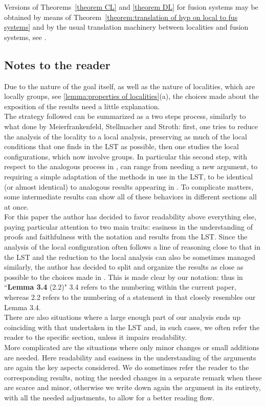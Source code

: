 \documentclass{amsart}
\numberwithin{equation}{section}
\theoremstyle{definition}
\theoremstyle{subresult}
\theoremstyle{caseresult}
\newcommand{\<}{\langle}
\renewcommand{\>}{\rangle}
\begin{document}
Versions of Theorems~\ref{theorem CL} and \ref{theorem DL} for fusion systems may be obtained by means of Theorem~\ref{theorem:translation of hyp on local to fus systems} and by the usual translation machinery between localities and fusion systems, see \cite{ChermakHenke:2021}.

\subsection{Notes to the reader}
Due to the nature of the goal itself, as well as the nature of localities, which are locally groups, see \ref{lemma:properties of localities}(a), the choices made about the exposition of the results need a little explanation.\\
The strategy followed can be summarized as a two steps process, similarly to what done by Meierfrankenfeld, Stellmacher and Stroth: first, one tries to reduce the analysis of the locality to a local analysis, preserving as much of the local conditions that one finds in the LST as possible, then one studies the local configurations, which now involve groups. In particular this second step, with respect to the analogous process in \cite{Meier-Stell-Stroth:2012}, can range from needing a new argument, to requiring a simple adaptation of the methods in use in the LST, to be identical (or almost identical) to analogous results appearing in \cite{Meier-Stell-Stroth:2012}. To complicate matters, some intermediate results can show all of these behaviors in different sections all at once.\\
For this paper the author has decided to favor readability above everything else, paying particular attention to two main traits: easiness in the understanding of proofs and faithfulness with the notation and results from the LST.
Since the analysis of the local configuration often follows a line of reasoning close to that in the LST and the reduction to the local analysis can also be sometimes managed similarly, the author has decided to split and organize the results as close as possible to the choices made in \cite{Meier-Stell-Stroth:2012}. This is made clear by our notation: thus in ``\textbf{Lemma 3.4} (2.2)" 3.4 refers to the numbering within the current paper, whereas 2.2 refers to the numbering of a statement in \cite{Meier-Stell-Stroth:2012} that closely resembles our Lemma 3.4.\\
There are also situations where a large enough part of our analysis ends up coinciding with that undertaken in the LST and, in such cases, we often refer the reader to the specific section, unless it impairs readability.\\
More complicated are the situations where only minor changes or small additions are needed. Here readability and easiness in the understanding of the arguments are again the key aspects considered. We do sometimes refer the reader to the corresponding results, noting the needed changes in a separate remark when these are scarce and minor, otherwise we write down again the argument in its entirety, with all the needed adjustments, to allow for a better reading flow.
\end{document}
